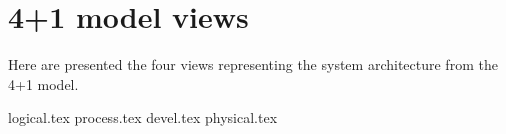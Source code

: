 \section{4+1 model views}

Here are presented the four views representing the system architecture from the 4+1 model.

{logical.tex}
{process.tex}
{devel.tex}
{physical.tex}